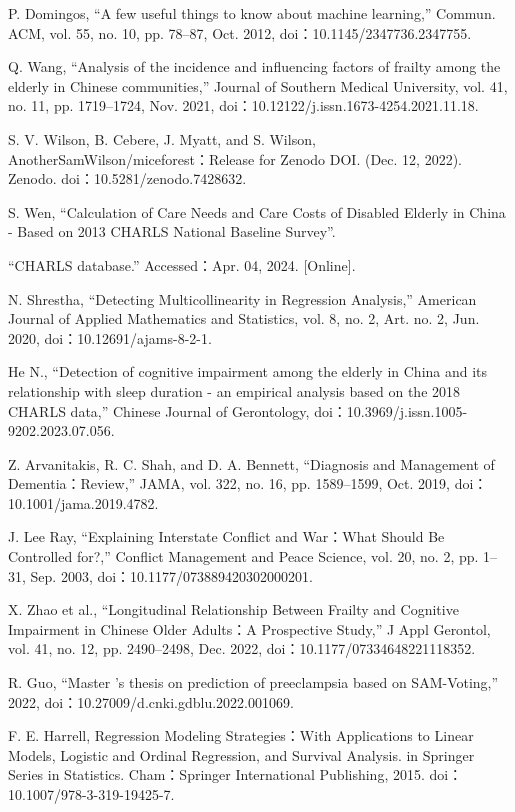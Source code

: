 \documentclass{base}
\numberwithin{figure}{section} %
\begin{document}
\newpage



\noindent[1] P. Domingos, “A few useful things to know about machine learning,” Commun. ACM, vol. 55, no. 10, pp. 78–87, Oct. 2012, doi：10.1145/2347736.2347755.

\noindent[2] Q. Wang, “Analysis of the incidence and influencing factors of frailty among the elderly in Chinese communities,” Journal of Southern Medical University, vol. 41, no. 11, pp. 1719–1724, Nov. 2021, doi：10.12122/j.issn.1673-4254.2021.11.18.

\noindent[3] S. V. Wilson, B. Cebere, J. Myatt, and S. Wilson, AnotherSamWilson/miceforest：Release for Zenodo DOI. (Dec. 12, 2022). Zenodo. doi：10.5281/zenodo.7428632.

\noindent[4] S. Wen, “Calculation of Care Needs and Care Costs of Disabled Elderly in China - Based  on 2013 CHARLS National Baseline Survey”.

\noindent[5] “CHARLS database.” Accessed：Apr. 04, 2024. [Online].

\noindent[6] N. Shrestha, “Detecting Multicollinearity in Regression Analysis,” American Journal of Applied Mathematics and Statistics, vol. 8, no. 2, Art. no. 2, Jun. 2020, doi：10.12691/ajams-8-2-1.

\noindent[7] He N., “Detection of cognitive impairment among the elderly in China and its relationship with sleep duration - an empirical analysis based on the 2018 CHARLS data,” Chinese Journal of Gerontology, doi：10.3969/j.issn.1005-9202.2023.07.056.

\noindent[8] Z. Arvanitakis, R. C. Shah, and D. A. Bennett, “Diagnosis and Management of Dementia：Review,” JAMA, vol. 322, no. 16, pp. 1589–1599, Oct. 2019, doi：10.1001/jama.2019.4782.

\noindent[9] J. Lee Ray, “Explaining Interstate Conflict and War：What Should Be Controlled for?,” Conflict Management and Peace Science, vol. 20, no. 2, pp. 1–31, Sep. 2003, doi：10.1177/073889420302000201.

\noindent[10] X. Zhao et al., “Longitudinal Relationship Between Frailty and Cognitive Impairment in Chinese Older Adults：A Prospective Study,” J Appl Gerontol, vol. 41, no. 12, pp. 2490–2498, Dec. 2022, doi：10.1177/07334648221118352.

\noindent[11] R. Guo, “Master ’s thesis on prediction of preeclampsia based on SAM-Voting,” 2022, doi：10.27009/d.cnki.gdblu.2022.001069.

\noindent[12] F. E. Harrell, Regression Modeling Strategies：With Applications to Linear Models, Logistic and Ordinal Regression, and Survival Analysis. in Springer Series in Statistics. Cham：Springer International Publishing, 2015. doi：10.1007/978-3-319-19425-7.
\end{document}
